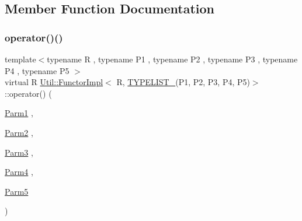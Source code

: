 \subsection{Member Function Documentation}
\mbox{\label{classUtil_1_1FunctorImpl_3_01R_00_01TYPELIST__5_07P1_00_01P2_00_01P3_00_01P4_00_01P5_08_4_afa0289015b075748033bab4939b8ecbb}} 
\subsubsection{\texorpdfstring{operator()()}{operator()()}\hspace{0.1cm}{\footnotesize\ttfamily [1/2]}}
{\footnotesize\ttfamily template$<$typename R , typename P1 , typename P2 , typename P3 , typename P4 , typename P5 $>$ \\
virtual R \mbox{\hyperlink{classUtil_1_1FunctorImpl}{Util\+::\+Functor\+Impl}}$<$ R, \mbox{\hyperlink{install_2include_2adat_2typelist_8h_aad5d9b3c82c8503c85c625acd41c0a2f}{T\+Y\+P\+E\+L\+I\+S\+T\+\_}}(P1, P2, P3, P4, P5)$>$\+::operator() (\begin{DoxyParamCaption}\item[{\mbox{\hyperlink{structUtil_1_1Private_1_1FunctorImplBase_a9d61e693d6c616dea5bd9d9073c7d21a}{Parm1}}}]{,  }\item[{\mbox{\hyperlink{structUtil_1_1Private_1_1FunctorImplBase_a554085cd798ef14838a59b528f0feb2e}{Parm2}}}]{,  }\item[{\mbox{\hyperlink{structUtil_1_1Private_1_1FunctorImplBase_a052148e627fd4caecbcffdbdf1033dbb}{Parm3}}}]{,  }\item[{\mbox{\hyperlink{structUtil_1_1Private_1_1FunctorImplBase_a1ad7fe3f243480c44a610927ebe76762}{Parm4}}}]{,  }\item[{\mbox{\hyperlink{structUtil_1_1Private_1_1FunctorImplBase_ac5b1d132e854e4f9fd6fb1e43313fa26}{Parm5}}}]{ }\end{DoxyParamCaption})\hspace{0.3cm}{\ttfamily [pure virtual]}}

\mbox{\label{classUtil_1_1FunctorImpl_3_01R_00_01TYPELIST__5_07P1_00_01P2_00_01P3_00_01P4_00_01P5_08_4_afa0289015b075748033bab4939b8ecbb}} 
